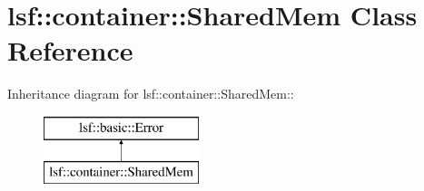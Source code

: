 \hypertarget{classlsf_1_1container_1_1SharedMem}{
\section{lsf::container::SharedMem Class Reference}
\label{classlsf_1_1container_1_1SharedMem}
}
Inheritance diagram for lsf::container::SharedMem::\begin{figure}[H]
\begin{center}
\leavevmode
\includegraphics[height=2cm]{classlsf_1_1container_1_1SharedMem}
\end{center}
\end{figure}
